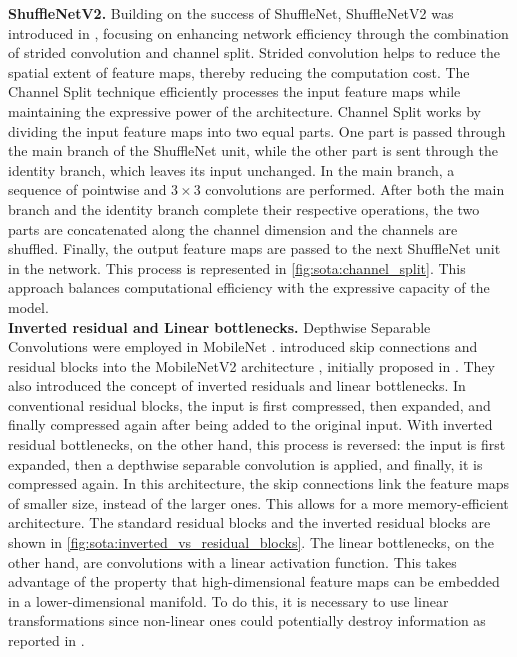 \noindent\textbf{ShuffleNetV2.} Building on the success of ShuffleNet,
ShuffleNetV2 was introduced in \cite{MaShuffleNetV2}, focusing on enhancing
network efficiency through the combination of strided convolution and channel
split. Strided convolution helps to reduce the spatial extent of feature maps,
thereby reducing the computation cost. The Channel Split technique efficiently
processes the input feature maps while maintaining the expressive power of the
architecture. Channel Split works by dividing the input feature maps into two
equal parts. One part is passed through the main branch of the ShuffleNet unit,
while the other part is sent through the identity branch, which leaves its input
unchanged. In the main branch, a sequence of pointwise and $3\times 3$
convolutions are performed. After both the main branch and the identity branch
complete their respective operations, the two parts are concatenated along the
channel dimension and the channels are shuffled. Finally, the output feature
maps are passed to the next ShuffleNet unit in the network. This process is
represented in \cref{fig:sota:channel_split}. This approach balances
computational efficiency with the expressive capacity of the model.\\

\noindent\textbf{Inverted residual and Linear bottlenecks.} Depthwise Separable
Convolutions were employed in MobileNet \cite{howard2017mobilenets}.
\citeauthor{DBLP:conf/cvpr/SandlerHZZC18} introduced skip connections and
residual blocks into the MobileNetV2 architecture
\cite{DBLP:conf/cvpr/SandlerHZZC18}, initially proposed in
\cite{DBLP:conf/cvpr/HeZRS16}. They also introduced the concept of inverted
residuals and linear bottlenecks. In conventional residual blocks, the input is
first compressed, then expanded, and finally compressed again after being added
to the original input. With inverted residual bottlenecks, on the other hand,
this process is reversed: the input is first expanded, then a depthwise
separable convolution is applied, and finally, it is compressed again. In this
architecture, the skip connections link the feature maps of smaller size,
instead of the larger ones. This allows for a more memory-efficient
architecture. The standard residual blocks and the inverted residual blocks are
shown in \cref{fig:sota:inverted_vs_residual_blocks}. The linear bottlenecks, on
the other hand, are convolutions with a linear activation function. This takes
advantage of the property that high-dimensional feature maps can be embedded in
a lower-dimensional manifold. To do this, it is necessary to use linear
transformations since non-linear ones could potentially destroy information as
reported in \cite{DBLP:conf/cvpr/SandlerHZZC18,DBLP:conf/cvpr/HanKK17}.\\

